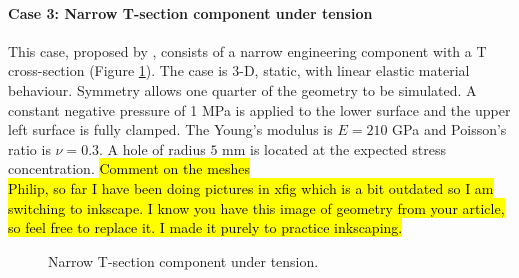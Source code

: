 \documentclass[sn-mathphys,Numbered]{sn-jnl}%
\begin{document}
\paragraph{Case 3: Narrow T-section component under tension}
This case, proposed by \citet{Demirdzic1997}, consists of a narrow engineering component with a T cross-section (Figure \ref{fig:narrowTmember}).
The case is 3-D, static, with linear elastic material behaviour.
Symmetry allows one quarter of the geometry to be simulated.
A constant negative pressure of 1 MPa is applied to the lower surface and the upper left surface is fully clamped.
The Young’s modulus is $E = 210$ GPa and Poisson’s ratio is $\nu = 0.3$.
A hole of radius $5$ mm is located at the expected stress concentration.
\hl{Comment on the meshes}
\\
\hl{Philip, so far I have been doing pictures in xfig which is a bit outdated so I am switching to inkscape. I know you have this image of geometry from your article, so feel free to replace it. I made it purely to practice inkscaping.}
\begin{figure}[H]
	\centering
   	\qquad
	\caption{Narrow T-section component under tension.}
	\label{fig:narrowTmember}
\end{figure}
\end{document}
